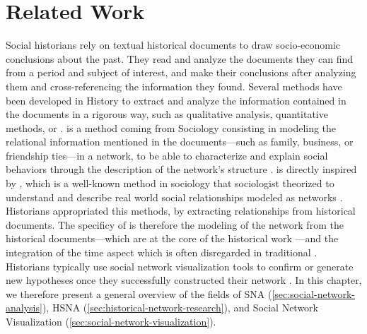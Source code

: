 
\chapter{Related Work}\label{ch:related-work}

Social historians rely on textual historical documents to draw socio-economic conclusions about the past.
They read and analyze the documents they can find from a period and subject of interest, and make their conclusions after analyzing them and cross-referencing the information they found.
Several methods have been developed in History to extract and analyze the information contained in the documents in a rigorous way, such as qualitative analysis, quantitative methods, or \hsna.
\hsna is a method coming from Sociology consisting in modeling the relational information mentioned in the documents---such as family, business, or friendship ties---in a network, to be able to characterize and explain social behaviors through the description of the network's structure \cite{wetherellHistoricalSocialNetwork1998, kerschbaumerPowerNetworksProspects2015}.
\hsna is directly inspired by \sna, which is a well-known method in sociology that sociologist theorized to understand and describe real world social relationships modeled as networks \cite{freemanDevelopmentSocialNetwork2004, scottSocialNetworkAnalysis1988}.
Historians appropriated this methods, by extracting relationships from historical documents.
The specificy of \hsna is therefore the modeling of the network from the historical documents---which are at the core of the historical work \cite{prost2014}---and the integration of the time aspect which is often disregarded in traditional \sna.
Historians typically use social network visualization tools to confirm or generate new hypotheses once they successfully constructed their network \cite{freemanVisualizingSocialNetworks2000}.
In this chapter, we therefore present a general overview of the fields of SNA (\autoref{sec:social-network-analysis}), HSNA (\autoref{sec:historical-network-research}), and Social Network Visualization (\autoref{sec:social-network-visualization}).


